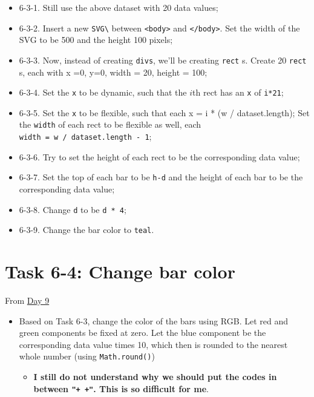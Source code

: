 \documentclass[
]{book}
\providecommand{\tightlist}{%
  \setlength{\itemsep}{0pt}\setlength{\parskip}{0pt}}
\begin{document}
\begin{itemize}
\item
  6-3-1. Still use the above dataset with 20 data values;
\item
  6-3-2. Insert a new \texttt{SVG\textbackslash{}} between \texttt{\textless{}body\textgreater{}} and \texttt{\textless{}/body\textgreater{}}. Set the width of the SVG to be 500 and the height 100 pixels;
\item
  6-3-3. Now, instead of creating \texttt{divs}, we'll be creating \texttt{rect} s. Create 20 \texttt{rect} s, each with x =0, y=0, width = 20, height = 100;
\item
  6-3-4. Set the \texttt{x} to be dynamic, such that the \(i\)th rect has an \texttt{x} of \texttt{i*21};
\item
  6-3-5. Set the \texttt{x} to be flexible, such that each x = i * (w / dataset.length); Set the \texttt{width} of each rect to be flexible as well, each \texttt{width\ =\ w\ /\ dataset.length\ -\ 1};
\item
  6-3-6. Try to set the height of each rect to be the corresponding data value;
\item
  6-3-7. Set the top of each bar to be \texttt{h-d} and the height of each bar to be the corresponding data value;
\item
  6-3-8. Change \texttt{d} to be \texttt{d\ *\ 4};
\item
  6-3-9. Change the bar color to \texttt{teal}.
\end{itemize}

\hypertarget{task-6-4-change-bar-color}{%
\section{Task 6-4: Change bar color}\label{task-6-4-change-bar-color}}

From \href{https://observablehq.com/@hongtaoh/day-nine-spet-2-2020}{Day 9}

\begin{itemize}
\item
  Based on Task 6-3, change the color of the bars using RGB. Let red and green components be fixed at zero. Let the blue component be the corresponding data value times 10, which then is rounded to the nearest whole number (using \texttt{Math.round()})

  \begin{itemize}
  \tightlist
  \item
    \textbf{I still do not understand why we should put the codes in between \texttt{"+\ +"}. This is so difficult for me}.
  \end{itemize}
\end{itemize}
\end{document}
